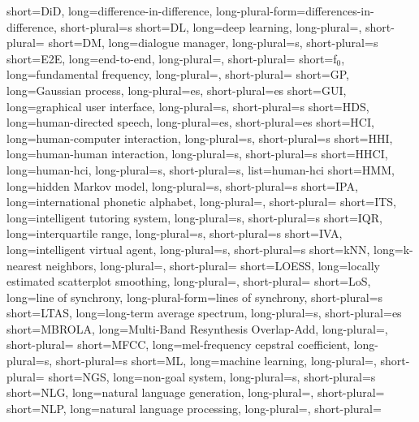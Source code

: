	{short=DiD, 	long=difference-in-difference, 						long-plural-form=differences-in-difference, short-plural=s}
		{short=DL,		long=deep learning,									long-plural=, short-plural=}
		{short=DM,		long=dialogue manager,								long-plural=s, short-plural=s}
	{short=E2E,		long=end-to-end,									long-plural=, short-plural=}
		{short=f$_0$,	long=fundamental frequency, 						long-plural=, short-plural=}
		{short=GP,		long=Gaussian process,								long-plural=es, short-plural=es}
	{short=GUI, 	long=graphical user interface, 						long-plural=s, short-plural=s}
	{short=HDS, 	long=human-directed speech, 						long-plural=es, short-plural=es}
	{short=HCI, 	long=human-computer interaction,					long-plural=s, short-plural=s}
	{short=HHI, 	long=human-human interaction,						long-plural=s, short-plural=s}
	{short=HHCI, 	long=human-\acl*{hci},								long-plural=s, short-plural=s, list=human-\acl*{hci}}
	{short=HMM, 	long=hidden Markov model, 							long-plural=s, short-plural=s}
	{short=IPA,		long=international phonetic alphabet, 				long-plural=, short-plural=}
	{short=ITS, 	long=intelligent tutoring system, 					long-plural=s, short-plural=s}
	{short=IQR, 	long=interquartile range,							long-plural=s, short-plural=s}
	{short=IVA,		long=intelligent virtual agent, 					long-plural=s, short-plural=s}
	{short=kNN,		long=k-nearest neighbors, 							long-plural=, short-plural=}
	{short=LOESS, 	long=locally estimated scatterplot smoothing, 		long-plural=, short-plural=}
	{short=LoS, 	long=line of synchrony,								long-plural-form=lines of synchrony, short-plural=s}
	{short=LTAS, 	long=long-term average spectrum,					long-plural=s, short-plural=es}
	{short=MBROLA, 	long=Multi-Band Resynthesis Overlap-Add,			long-plural=, short-plural=}
	{short=MFCC, 	long=mel-frequency cepstral coefficient,			long-plural=s, short-plural=s}
		{short=ML, 		long=machine learning, 								long-plural=, short-plural=}
	{short=NGS, 	long=non-goal system, 								long-plural=s, short-plural=s}
	{short=NLG, 	long=natural language generation, 					long-plural=, short-plural=}
	{short=NLP, 	long=natural language processing, 					long-plural=, short-plural=}
